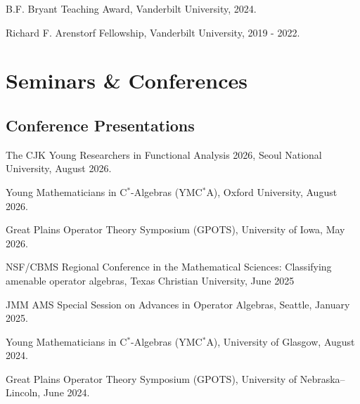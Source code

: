 \documentclass[10pt,a4paper]{article}
\renewenvironment{itemize}{
  \begin{list}{}{
      \setlength{\leftmargin}{1.5em}
      \setlength{\itemsep}{0.25em}
      \setlength{\parskip}{0pt}
      \setlength{\parsep}{0.25em}
    }
}{
  \end{list}
}
\begin{document}
\begin{itemize}
\item B.F. Bryant Teaching Award, Vanderbilt University, 2024.
\item Richard F. Arenstorf Fellowship, Vanderbilt University, 2019 - 2022.
\end{itemize}


\section*{Seminars \& Conferences}

\subsection*{Conference Presentations}
\begin{itemize}
        \item The CJK Young Researchers in Functional Analysis 2026, Seoul National University, August 2026.
        \item Young Mathematicians in C$^{*}$-Algebras (YMC$^{*}$A), Oxford University, August 2026.
        \item Great Plains Operator Theory Symposium (GPOTS), University of Iowa, May 2026.
        \item NSF/CBMS Regional Conference in the Mathematical Sciences: Classifying amenable operator algebras, Texas Christian University, June 2025
        \item JMM AMS Special Session on Advances in Operator Algebras, Seattle, January 2025.
        \item Young Mathematicians in C$^{*}$-Algebras (YMC$^{*}$A), University of Glasgow, August 2024.
		\item Great Plains Operator Theory Symposium (GPOTS), University of Nebraska–Lincoln, June 2024.
\end{itemize}
\end{document}
